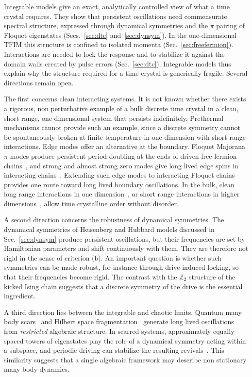 \documentclass[%
reprint,
superscriptaddress,
amsmath,amssymb,
aps,
prb,
showkeys,%
floatfix,
]{revtex4-2}
\let\cite\citep   %
\begin{document}
	Integrable models give an exact, analytically controlled view of what a time crystal requires. They show that persistent oscillations need commensurate spectral structure, expressed through dynamical symmetries and the $\pi$ pairing of Floquet eigenstates (Secs.~\ref{sec:dtc} and~\ref{sec:dynsym}). In the one-dimensional TFIM this structure is confined to isolated momenta (Sec.~\ref{sec:freefermion}). Interactions are needed to lock the response and to stabilize it against the domain walls created by pulse errors (Sec.~\ref{sec:dtc}). Integrable models thus explain why the structure required for a time crystal is generically fragile. Several directions remain open.
	
	The first concerns clean interacting systems. It is not known whether there exists a rigorous, non perturbative example of a bulk discrete time crystal in a clean, short range, one dimensional system that persists indefinitely. Prethermal mechanisms cannot provide such an example, since a discrete symmetry cannot be spontaneously broken at finite temperature in one dimension with short range interactions. Edge modes offer an alternative at the boundary. Floquet Majorana $\pi$ modes produce persistent period doubling at the ends of driven free fermion chains~\cite{Thakurathi2013}, and strong and almost strong zero modes give long lived edge spins in interacting chains~\cite{Fendley2016,Kemp2017}. Extending such edge modes to interacting Floquet chains provides one route toward long lived boundary oscillations. In the bulk, clean long range interactions in one dimension~\cite{Russomanno2017,Pizzi2021}, or short range interactions in higher dimensions~\cite{ElseBauerNayakPRX2017}, allow time crystalline order without disorder.
	
	A second direction concerns the robustness of dynamical symmetries. The dynamical symmetries of Heisenberg and Hubbard models discussed in Sec.~\ref{sec:dynsym} produce persistent oscillations, but their frequencies are set by Hamiltonian parameters and shift continuously with them. They are therefore not rigid in the sense of criterion (b). An important question is whether such symmetries can be made robust, for instance through drive-induced locking, so that their frequencies become rigid. The contrast with the $\mathbb{Z}_2$ structure of the kicked Ising chain suggests that a discrete symmetry of the drive is the essential ingredient.
	
	A third direction lies between the integrable and chaotic limits. Quantum many body scars~\cite{Turner2018,SerbynScarsReview2021} and Hilbert space fragmentation~\cite{Sala2020} generate long lived oscillations from \emph{restricted} algebraic structure. In scarred systems, approximately equally spaced towers of eigenstates play the role of a dynamical symmetry acting within a subspace, and periodic driving can stabilize the resulting revivals~\cite{Bluvstein2021}. This similarity suggests that a single algebraic framework may describe non stationary many body dynamics.
	
\end{document}
